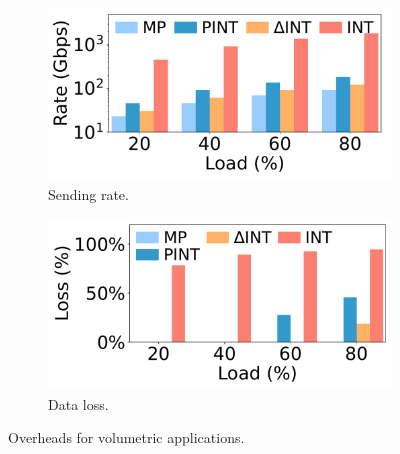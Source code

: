 \begin{figure}[t]
    \centering
    \begin{subfigure}{0.49\linewidth}
    \centering
    \includegraphics[width=\linewidth]{pics/pc-rate.pdf}
    \vspace{-20pt}
    \caption{Sending rate.}
    \end{subfigure}
    \begin{subfigure}{0.49\linewidth}
    \centering
    \includegraphics[width=\linewidth]{pics/pc-loss.pdf}
    \vspace{-20pt}
    \caption{Data loss.}
    \end{subfigure}
    \caption{Overheads for volumetric applications.}
    \vspace{-2pt}
    \label{fig:volumetric-loss}
\end{figure}

